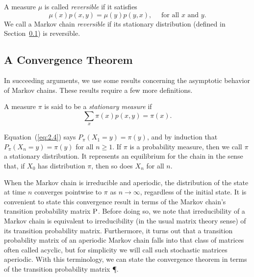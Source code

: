 \begin{definition}
\label{def:2.1.3}
A measure $\mu$ is called \emph{reversible} if it satisfies
\[
\mu(x)p(x,y) = \mu(y)p(y,x), \quad  \text{ for all $x$ and $y$.}
\]
We call a Markov chain \emph{reversible} if its stationary distribution (defined
in Section~\ref{sec:convergence-theorem}) is reversible. 
\end{definition}




\subsection{A Convergence Theorem}
\label{sec:convergence-theorem}
In succeeding arguments, we use some results concerning the asymptotic behavior of
Markov chains. These results require a few more definitions.

\begin{definition}
A measure $\pi$ is said to be a \emph{stationary measure} if
\begin{equation}
  \label{eq:2.4}
\sum_x \pi(x) p(x,y) = \pi(x).
\end{equation}
\end{definition}

Equation~(\ref{eq:2.4}) says $P_\pi(X_1 = y) = \pi(y)$, 
and by induction that $P_\pi(X_n = y) = \pi(y)$ for all $n \geq 1$. 
If $\pi$ is a probability measure, then we call $\pi$ a stationary distribution. It
represents an equilibrium for the chain in the sense that, if $X_0$ has
distribution $\pi$, then so does $X_n$ for all $n$.

When the Markov chain is irreducible and aperiodic, the distribution of the state at time
$n$ converges pointwise to $\pi$ as $n \rightarrow \infty$, regardless of the
initial state. It is convenient to state this convergence result in terms of the
Markov chain's transition probability matrix $\P$. Before doing so, we note that
irreducibility of a Markov chain is equivalent to irreducibility (in the usual 
matrix theory sense) of its transition probability matrix. Furthermore, it turns
out that a transition probability matrix of an aperiodic Markov chain falls into
that class of matrices often called acyclic, but for simplicity we will call
such stochastic matrices aperiodic. With this terminology, we can state the
convergence theorem in terms of the transition probability matrix \P. 

